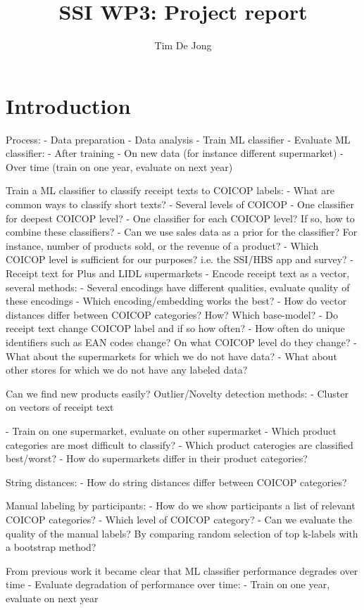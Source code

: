 \documentclass{article}
\title{SSI WP3: Project report}
\author{Tim De Jong}
\begin{document}
\maketitle


\section{Introduction}

Process:
- Data preparation
- Data analysis
- Train ML classifier
- Evaluate ML classifier:
    - After training
    - On new data (for instance different supermarket)
    - Over time (train on one year, evaluate on next year)




Train a ML classifier to classify receipt texts to COICOP labels:
- What are common ways to classify short texts?
- Several levels of COICOP
    - One classifier for deepest COICOP level?
    - One classifier for each COICOP level? If so, how to combine these classifiers?
    - Can we use sales data as a prior for the classifier? For instance, number of products sold, 
    or the revenue of a product?
    - Which COICOP level is sufficient for our purposes? i.e. the SSI/HBS app and survey?
- Receipt text for Plus and LIDL supermarkets
- Encode receipt text as a vector, several methods: 
    - Several encodings have different qualities, evaluate quality of these encodings
    - Which encoding/embedding works the best?
    - How do vector distances differ between COICOP categories? How? Which base-model?
- Do receipt text change COICOP label and if so how often?
- How often do unique identifiers such as EAN codes change? On what COICOP level do they change?
- What about the supermarkets for which we do not have data? 
- What about other stores for which we do not have any labeled data?
    
Can we find new products easily? Outlier/Novelty detection methods:    
    - Cluster on vectors of receipt text

- Train on one supermarket, evaluate on other supermarket
- Which product categories are most difficult to classify?
- Which product caterogies are classified best/worst?
- How do supermarkets differ in their product categories?

String distances:
- How do string distances differ between COICOP categories?

Manual labeling by participants:
- How do we show participants a list of relevant COICOP categories?
- Which level of COICOP category?
- Can we evaluate the quality of the manual labels? By comparing random selection of top k-labels with a 
bootstrap method?

From previous work it became clear that ML classifier performance degrades over time
- Evaluate degradation of performance over time:
    - Train on one year, evaluate on next year
\end{document}
